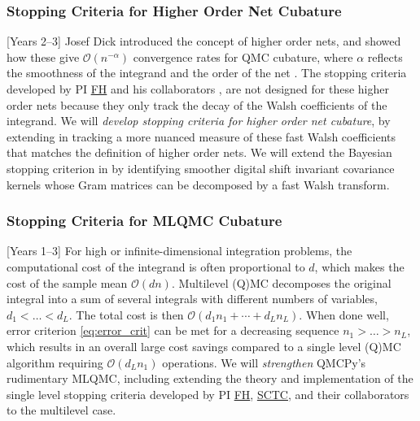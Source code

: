 \documentclass[11pt]{NSFamsart}
\newcommand{\FH}{\hyperlink{FHlink}{FH}\xspace}
\newcommand{\SCTC}{\hyperlink{SCTClink}{SCTC}\xspace}
\newcommand{\Order}{\mathcal{O}}
\begin{document}
\subsubsection{Stopping Criteria for Higher Order Net Cubature} \label{sec:HONstop} 
[Years 2--3] Josef Dick introduced the concept of higher order nets, and showed how these give $\Order(n^{-\alpha})$ convergence rates for QMC cubature, where $\alpha$ reflects the smoothness of the integrand and the order of the net \cite{Dic08a,Dic09a,Dic11a}.  The stopping criteria developed by PI \FH and his collaborators \cite{HicJim16a,HicEtal17a,Jag19a}, are not designed for these higher order nets because they only track the decay of the Walsh coefficients of the integrand. We will \emph{develop stopping criteria for higher order net cubature}, by extending \cite{HicJim16a} in tracking a more nuanced measure of these fast Walsh coefficients that matches the definition of higher order nets.  We will extend the Bayesian stopping criterion in \cite{Jag19a} by identifying smoother digital shift invariant covariance kernels whose Gram matrices can be decomposed by a fast Walsh transform.

\subsubsection{Stopping Criteria for MLQMC Cubature} \label{sec:stopML}
[Years 1--3]
For high or infinite-dimensional integration problems, the computational cost of the integrand is often proportional to $d$, which makes the cost of the sample mean $\Order(dn)$.  Multilevel (Q)MC \cite{Gil15a} decomposes the original integral into a sum of several integrals with different numbers of variables, $d_1 < \dots < d_L$.  The total cost is then $\Order(d_1 n_1 + \cdots + d_L n_L)$. When done well, error criterion \eqref{eq:error_crit} can be met for a decreasing sequence $n_1 > \dots > n_L$, which results in an overall large cost savings compared to a single level (Q)MC algorithm requiring $\Order(d_Ln_1)$ operations. We will \textit{strengthen} QMCPy's rudimentary MLQMC, including extending the theory and implementation of the single level stopping criteria developed by PI \FH, \SCTC, and their collaborators \cite{HicEtal14a,HicJim16a,JimHic16a,HicEtal17a,RatHic19a} to the multilevel case.
\end{document}
